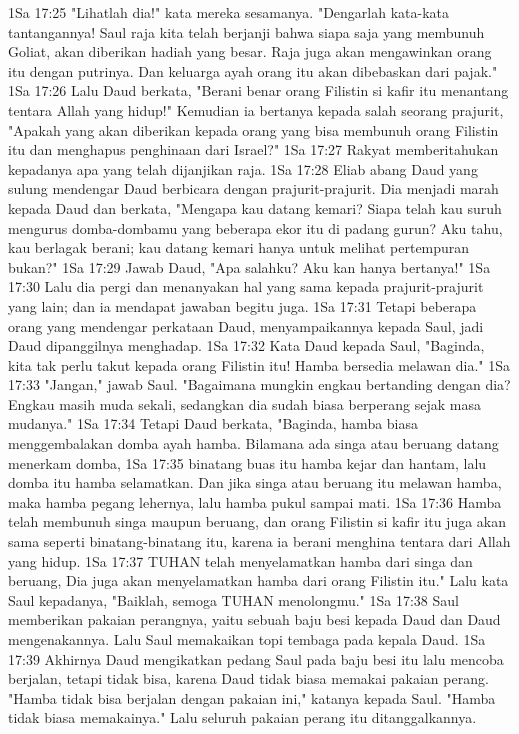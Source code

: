 1Sa 17:25  "Lihatlah dia!" kata mereka sesamanya. "Dengarlah kata-kata tantangannya! Saul raja kita telah berjanji bahwa siapa saja yang membunuh Goliat, akan diberikan hadiah yang besar. Raja juga akan mengawinkan orang itu dengan putrinya. Dan keluarga ayah orang itu akan dibebaskan dari pajak."
1Sa 17:26  Lalu Daud berkata, "Berani benar orang Filistin si kafir itu menantang tentara Allah yang hidup!" Kemudian ia bertanya kepada salah seorang prajurit, "Apakah yang akan diberikan kepada orang yang bisa membunuh orang Filistin itu dan menghapus penghinaan dari Israel?"
1Sa 17:27  Rakyat memberitahukan kepadanya apa yang telah dijanjikan raja.
1Sa 17:28  Eliab abang Daud yang sulung mendengar Daud berbicara dengan prajurit-prajurit. Dia menjadi marah kepada Daud dan berkata, "Mengapa kau datang kemari? Siapa telah kau suruh mengurus domba-dombamu yang beberapa ekor itu di padang gurun? Aku tahu, kau berlagak berani; kau datang kemari hanya untuk melihat pertempuran bukan?"
1Sa 17:29  Jawab Daud, "Apa salahku? Aku kan hanya bertanya!"
1Sa 17:30  Lalu dia pergi dan menanyakan hal yang sama kepada prajurit-prajurit yang lain; dan ia mendapat jawaban begitu juga.
1Sa 17:31  Tetapi beberapa orang yang mendengar perkataan Daud, menyampaikannya kepada Saul, jadi Daud dipanggilnya menghadap.
1Sa 17:32  Kata Daud kepada Saul, "Baginda, kita tak perlu takut kepada orang Filistin itu! Hamba bersedia melawan dia."
1Sa 17:33  "Jangan," jawab Saul. "Bagaimana mungkin engkau bertanding dengan dia? Engkau masih muda sekali, sedangkan dia sudah biasa berperang sejak masa mudanya."
1Sa 17:34  Tetapi Daud berkata, "Baginda, hamba biasa menggembalakan domba ayah hamba. Bilamana ada singa atau beruang datang menerkam domba,
1Sa 17:35  binatang buas itu hamba kejar dan hantam, lalu domba itu hamba selamatkan. Dan jika singa atau beruang itu melawan hamba, maka hamba pegang lehernya, lalu hamba pukul sampai mati.
1Sa 17:36  Hamba telah membunuh singa maupun beruang, dan orang Filistin si kafir itu juga akan sama seperti binatang-binatang itu, karena ia berani menghina tentara dari Allah yang hidup.
1Sa 17:37  TUHAN telah menyelamatkan hamba dari singa dan beruang, Dia juga akan menyelamatkan hamba dari orang Filistin itu." Lalu kata Saul kepadanya, "Baiklah, semoga TUHAN menolongmu."
1Sa 17:38  Saul memberikan pakaian perangnya, yaitu sebuah baju besi kepada Daud dan Daud mengenakannya. Lalu Saul memakaikan topi tembaga pada kepala Daud.
1Sa 17:39  Akhirnya Daud mengikatkan pedang Saul pada baju besi itu lalu mencoba berjalan, tetapi tidak bisa, karena Daud tidak biasa memakai pakaian perang. "Hamba tidak bisa berjalan dengan pakaian ini," katanya kepada Saul. "Hamba tidak biasa memakainya." Lalu seluruh pakaian perang itu ditanggalkannya.
